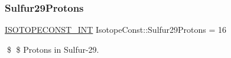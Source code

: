 \subsubsection{\texorpdfstring{Sulfur29\+Protons}{Sulfur29Protons}}
{\footnotesize\ttfamily \mbox{\hyperlink{group___isotope_const-_macros_ga5f18360b3e99483a35c32d789e62621c}{I\+S\+O\+T\+O\+P\+E\+C\+O\+N\+S\+T\+\_\+\+I\+NT}} Isotope\+Const\+::\+Sulfur29\+Protons = 16}

\$ \$ Protons in Sulfur-\/29. 